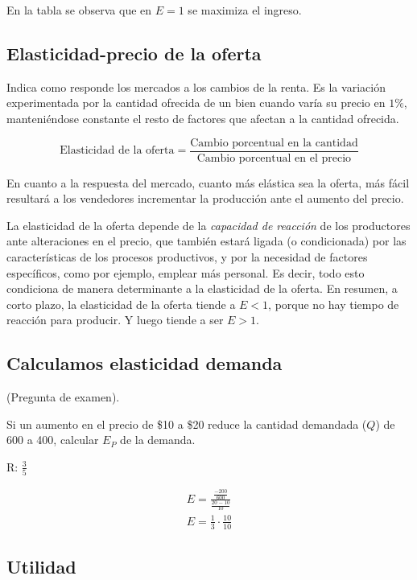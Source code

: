 En la tabla se observa que en \(E=1\) se maximiza el ingreso.

\subsection{Elasticidad-precio de la oferta}

Indica como responde los mercados a los cambios de la renta.
Es la variación experimentada por la cantidad ofrecida de un bien cuando varía su precio en \(1\%\),
manteniéndose constante el resto de factores que afectan a la cantidad ofrecida.

\begin{equation*}
    \text{Elasticidad de la oferta} = \frac{\text{Cambio porcentual en la cantidad}}{\text{Cambio porcentual en el precio}}
\end{equation*}

En cuanto a la respuesta del mercado,
cuanto más elástica sea la oferta,
más fácil resultará a los vendedores incrementar la producción ante el aumento del precio.

La elasticidad de la oferta depende de la \textit{capacidad de reacción} de los productores
ante alteraciones en el precio,
que también estará ligada (o condicionada)
por las características de los procesos productivos,
y por la necesidad de factores específicos,
como por ejemplo, emplear más personal.
Es decir,
todo esto condiciona de manera determinante a la elasticidad de la oferta.
En resumen,
a corto plazo,
la elasticidad de la oferta tiende a \(E<1\),
porque no hay tiempo de reacción para producir.
Y luego tiende a ser \(E>1\).

\subsection{Calculamos elasticidad demanda}

(Pregunta de examen).

Si un aumento en el precio de \$10 a \$20 reduce la cantidad demandada (\(Q\)) de 600 a 400,
calcular \(E_P\) de la demanda.

R: \(\frac{3}{5}\)

\begin{align*}
    E = \frac{\frac{-200}{600}}{\frac{20 - 10}{10}} \\
    E = \frac{1}{3} \cdot \frac{10}{10}
\end{align*}

\subsection{Utilidad}

